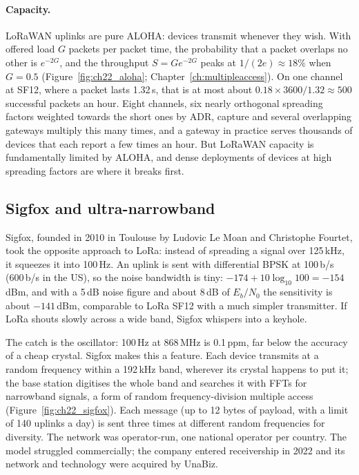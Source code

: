 \paragraph{Capacity.} LoRaWAN uplinks are pure ALOHA: devices transmit whenever they wish. With offered
load $G$ packets per packet time, the probability that a packet overlaps no other is $e^{-2G}$, and the
throughput $S=Ge^{-2G}$ peaks at $1/(2e)\approx18\%$ when $G=0.5$ (Figure~\ref{fig:ch22_aloha};
Chapter~\ref{ch:multipleaccess}). On one channel at SF12, where a packet lasts 1.32\,s, that is at most
about $0.18\times3600/1.32\approx500$ successful packets an hour. Eight channels, six nearly orthogonal
spreading factors weighted towards the short ones by ADR, capture and several overlapping gateways
multiply this many times, and a gateway in practice serves thousands of devices that each report a few
times an hour. But LoRaWAN capacity is fundamentally limited by ALOHA, and dense deployments of devices
at high spreading factors are where it breaks first.


\subsection{Sigfox and ultra-narrowband}

Sigfox, founded in 2010 in Toulouse by Ludovic Le Moan and Christophe Fourtet, took the opposite
approach to LoRa: instead of spreading a signal over 125\,kHz, it squeezes it into 100\,Hz. An uplink is
sent with differential BPSK at 100\,b/s (600\,b/s in the US), so the noise bandwidth is tiny:
$-174+10\log_{10}100=-154$\,dBm, and with a 5\,dB noise figure and about 8\,dB of $E_b/N_0$ the
sensitivity is about $-141$\,dBm, comparable to LoRa SF12 with a much simpler transmitter. If LoRa
shouts slowly across a wide band, Sigfox whispers into a keyhole.

The catch is the oscillator: 100\,Hz at 868\,MHz is 0.1\,ppm, far below the accuracy of a cheap crystal.
Sigfox makes this a feature. Each device transmits at a random frequency within a 192\,kHz band,
wherever its crystal happens to put it; the base station digitises the whole band and searches it
with FFTs for narrowband signals, a form of random frequency-division multiple access
(Figure~\ref{fig:ch22_sigfox}). Each message (up to 12 bytes of payload, with a limit of 140 uplinks a
day) is sent three times at different random frequencies for diversity. The network was
operator-run, one national operator per country. The model struggled commercially; the company
entered receivership in 2022 and its network and technology were acquired by UnaBiz.

